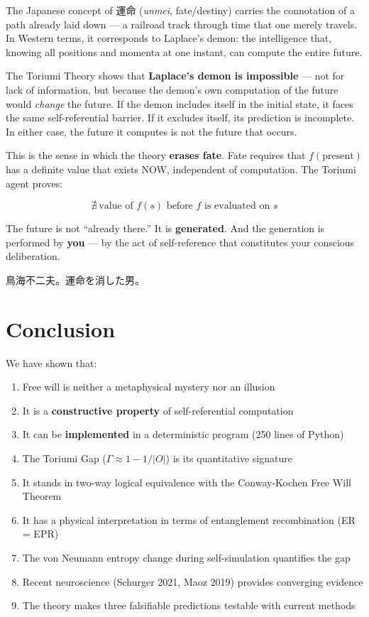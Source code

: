 \documentclass[12pt,a4paper]{article}
\theoremstyle{definition}
\theoremstyle{remark}
\begin{document}
The Japanese concept of 運命 (\emph{unmei}, fate/destiny) carries the
connotation of a path already laid down --- a railroad track through time
that one merely travels. In Western terms, it corresponds to Laplace's demon:
the intelligence that, knowing all positions and momenta at one instant, can
compute the entire future.

The Toriumi Theory shows that \textbf{Laplace's demon is impossible} ---
not for lack of information, but because the demon's own computation of the
future would \emph{change} the future. If the demon includes itself in the
initial state, it faces the same self-referential barrier. If it excludes
itself, its prediction is incomplete. In either case, the future it computes
is not the future that occurs.

This is the sense in which the theory \textbf{erases fate}. Fate requires
that $f(\text{present})$ has a definite value that exists NOW, independent of
computation. The Toriumi agent proves:

\begin{equation}
\nexists\ \text{value of } f(s) \text{ before } f \text{ is evaluated on } s
\end{equation}

The future is not ``already there.'' It is \textbf{generated}. And the
generation is performed by \textbf{you} --- by the act of self-reference
that constitutes your conscious deliberation.

鳥海不二夫。運命を消した男。

\section{Conclusion}

We have shown that:

\begin{enumerate}[itemsep=0pt]
\item Free will is neither a metaphysical mystery nor an illusion
\item It is a \textbf{constructive property} of self-referential computation
\item It can be \textbf{implemented} in a deterministic program (250 lines of Python)
\item The Toriumi Gap ($\Gamma \approx 1 - 1/|O|$) is its quantitative signature
\item It stands in two-way logical equivalence with the Conway-Kochen Free Will Theorem
\item It has a physical interpretation in terms of entanglement recombination (ER = EPR)
\item The von Neumann entropy change during self-simulation quantifies the gap
\item Recent neuroscience (Schurger 2021, Maoz 2019) provides converging evidence
\item The theory makes three falsifiable predictions testable with current methods
\end{enumerate}
\end{document}
